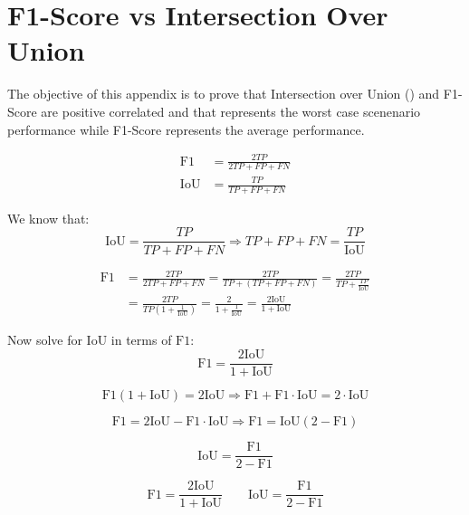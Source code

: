 \newpage


\section{F1-Score vs Intersection Over Union} \label{appendix:f1_iou}
The objective of this appendix is to prove that Intersection over Union () and F1-Score are positive correlated and that  represents the worst case scenenario performance while F1-Score represents the average performance.

\begin{equation}
    \begin{aligned}
    \text{F1} &= \frac{2TP}{2TP + FP + FN} \\
    \text{IoU} &= \frac{TP}{TP + FP + FN}
    \end{aligned}
\end{equation}
    
\noindent
We know that:
\[
\text{IoU} = \frac{TP}{TP + FP + FN} \Rightarrow TP + FP + FN = \frac{TP}{\text{IoU}}
\]

\begin{equation}
    \begin{aligned}
        \text{F1} &= \frac{2TP}{2TP + FP + FN} = \frac{2TP}{TP + (TP + FP + FN)} = \frac{2TP}{TP + \frac{TP}{\text{IoU}}} \\
        &= \frac{2TP}{TP \left(1 + \frac{1}{\text{IoU}}\right)} = \frac{2}{1 + \frac{1}{\text{IoU}}} = \frac{2\text{IoU}}{1 + \text{IoU}}
    \end{aligned}
\end{equation}
    

\noindent
Now solve for \(\text{IoU}\) in terms of \(\text{F1}\):
\[
\text{F1} = \frac{2\text{IoU}}{1 + \text{IoU}}
\]
    
\[
\text{F1}(1 + \text{IoU}) = 2\text{IoU}
\Rightarrow \text{F1} + \text{F1} \cdot \text{IoU} = 2 \cdot \text{IoU}
\]
    
\[
\text{F1} = 2\text{IoU} - \text{F1} \cdot \text{IoU}
\Rightarrow \text{F1} = \text{IoU}(2 - \text{F1})
\]
    
\[
\text{IoU} = \frac{\text{F1}}{2 - \text{F1}}
\]
    
\begin{equation}
    \boxed{
    \text{F1} = \frac{2\text{IoU}}{1 + \text{IoU}} \qquad
    \text{IoU} = \frac{\text{F1}}{2 - \text{F1}}
    }
    \label{eq:conversion}
\end{equation}

